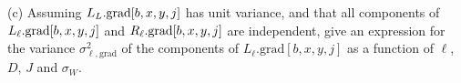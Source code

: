 \documentclass{article}
\begin{document}

\medskip
(c) Assuming $L_L.\mathrm{grad}[b,x,y,j]$ has unit variance, and that all components of $L_\ell.\mathrm{grad}[b,x,y,j]$ and $R_\ell.\mathrm{grad}[b,x,y,j]$ are independent,
give an expression for the variance
$\sigma^2_{\ell,\mathrm{grad}}$ of the components of $L_\ell.\mathrm{grad}[b,x,y,j]$ as a function of $\ell$, $D$, $J$ and $\sigma_W$.
\end{document}
